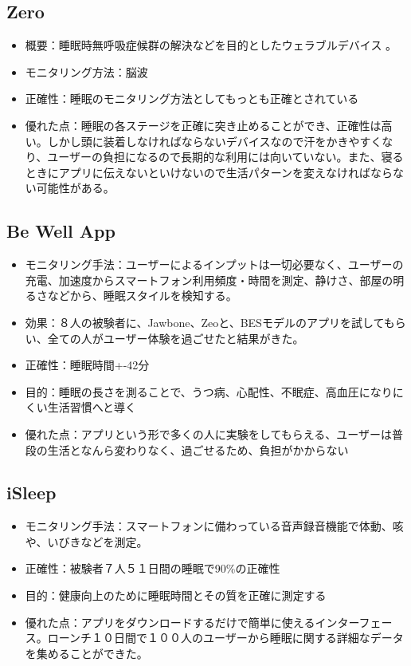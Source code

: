 \subsection{Zero}
\begin{itemize}
\item 概要：睡眠時無呼吸症候群の解決などを目的としたウェラブルデバイス \cite{beWellApp}。
\item モニタリング方法：脳波
\item 正確性：睡眠のモニタリング方法としてもっとも正確とされている
\item 優れた点：睡眠の各ステージを正確に突き止めることができ、正確性は高い。しかし頭に装着しなければならないデバイスなので汗をかきやすくなり、ユーザーの負担になるので長期的な利用には向いていない。また、寝るときにアプリに伝えないといけないので生活パターンを変えなければならない可能性がある。
\end{itemize}

\subsection{Be Well App}
\begin{itemize}
\item モニタリング手法：ユーザーによるインプットは一切必要なく、ユーザーの充電、加速度からスマートフォン利用頻度・時間を測定、静けさ、部屋の明るさなどから、睡眠スタイルを検知する。 \cite{beWellApp}
\item 効果：８人の被験者に、Jawbone、Zeoと、BESモデルのアプリを試してもらい、全ての人がユーザー体験を過ごせたと結果がきた。
\item 正確性：睡眠時間+-42分
\item 目的：睡眠の長さを測ることで、うつ病、心配性、不眠症、高血圧になりにくい生活習慣へと導く
\item 優れた点：アプリという形で多くの人に実験をしてもらえる、ユーザーは普段の生活となんら変わりなく、過ごせるため、負担がかからない
\end{itemize}

\subsection{iSleep}
\begin{itemize}
\item モニタリング手法：スマートフォンに備わっている音声録音機能で体動、咳や、いびきなどを測定。 \cite{iSleep}
\item 正確性：被験者７人５１日間の睡眠で90\%の正確性
\item 目的：健康向上のために睡眠時間とその質を正確に測定する
\item 優れた点：アプリをダウンロードするだけで簡単に使えるインターフェース。ローンチ１０日間で１００人のユーザーから睡眠に関する詳細なデータを集めることができた。
\end{itemize}

